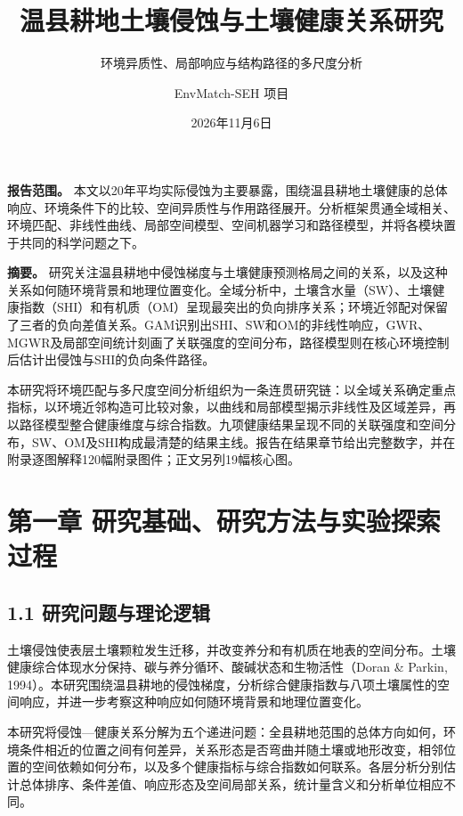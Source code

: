 \documentclass[
  11pt,
  a4paper,
]{ctexart}
\title{温县耕地土壤侵蚀与土壤健康关系研究}
\subtitle{环境异质性、局部响应与结构路径的多尺度分析}
\author{EnvMatch-SEH 项目}
\date{2026年11月6日}
\let\origmaketitle\maketitle
\renewcommand{\maketitle}{\origmaketitle\thispagestyle{empty}\clearpage}
\begin{document}
\maketitle

{
\setcounter{tocdepth}{3}
\tableofcontents
}
\textbf{报告范围。}
本文以20年平均实际侵蚀为主要暴露，围绕温县耕地土壤健康的总体响应、环境条件下的比较、空间异质性与作用路径展开。分析框架贯通全域相关、环境匹配、非线性曲线、局部空间模型、空间机器学习和路径模型，并将各模块置于共同的科学问题之下。

\textbf{摘要。}
研究关注温县耕地中侵蚀梯度与土壤健康预测格局之间的关系，以及这种关系如何随环境背景和地理位置变化。全域分析中，土壤含水量（SW）、土壤健康指数（SHI）和有机质（OM）呈现最突出的负向排序关系；环境近邻配对保留了三者的负向差值关系。GAM识别出SHI、SW和OM的非线性响应，GWR、MGWR及局部空间统计刻画了关联强度的空间分布，路径模型则在核心环境控制后估计出侵蚀与SHI的负向条件路径。

本研究将环境匹配与多尺度空间分析组织为一条连贯研究链：以全域关系确定重点指标，以环境近邻构造可比较对象，以曲线和局部模型揭示非线性及区域差异，再以路径模型整合健康维度与综合指数。九项健康结果呈现不同的关联强度和空间分布，SW、OM及SHI构成最清楚的结果主线。报告在结果章节给出完整数字，并在附录逐图解释120幅附录图件；正文另列19幅核心图。

\hypertarget{ux7b2cux4e00ux7ae0-ux7814ux7a76ux57faux7840ux7814ux7a76ux65b9ux6cd5ux4e0eux5b9eux9a8cux63a2ux7d22ux8fc7ux7a0b}{%
\section{第一章
研究基础、研究方法与实验探索过程}\label{ux7b2cux4e00ux7ae0-ux7814ux7a76ux57faux7840ux7814ux7a76ux65b9ux6cd5ux4e0eux5b9eux9a8cux63a2ux7d22ux8fc7ux7a0b}}

\hypertarget{ux7814ux7a76ux95eeux9898ux4e0eux7406ux8bbaux903bux8f91}{%
\subsection{1.1
研究问题与理论逻辑}\label{ux7814ux7a76ux95eeux9898ux4e0eux7406ux8bbaux903bux8f91}}

土壤侵蚀使表层土壤颗粒发生迁移，并改变养分和有机质在地表的空间分布。土壤健康综合体现水分保持、碳与养分循环、酸碱状态和生物活性（Doran
\& Parkin,
1994）。本研究围绕温县耕地的侵蚀梯度，分析综合健康指数与八项土壤属性的空间响应，并进一步考察这种响应如何随环境背景和地理位置变化。

本研究将侵蚀---健康关系分解为五个递进问题：全县耕地范围的总体方向如何，环境条件相近的位置之间有何差异，关系形态是否弯曲并随土壤或地形改变，相邻位置的空间依赖如何分布，以及多个健康指标与综合指数如何联系。各层分析分别估计总体排序、条件差值、响应形态及空间局部关系，统计量含义和分析单位相应不同。
\end{document}
